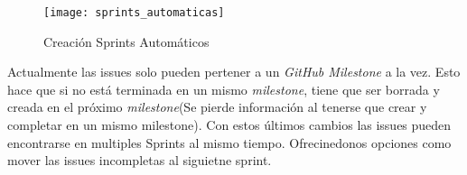 \documentclass[11pt]{article}
\begin{document}
\begin{figure}[h!] %
\centering
    \texttt{[image: sprints\_automaticas]}
\caption{Creación Sprints Automáticos}
\label{fig:sprints}
\end{figure}

Actualmente las issues solo pueden pertener a un \textit{GitHub Milestone} a la vez. Esto hace que si no está terminada en un mismo \textit{milestone}, tiene que ser borrada y creada en el próximo \textit{milestone}(Se pierde información al tenerse que crear y completar en  un mismo milestone). Con estos últimos cambios las issues pueden encontrarse en multiples Sprints al mismo tiempo. Ofrecinedonos opciones como mover las issues incompletas al siguietne sprint.











\end{document}
